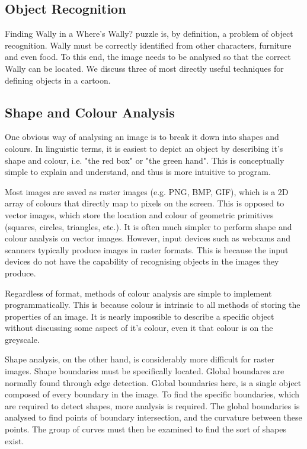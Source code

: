 \documentclass[../main.tex]{subfiles}
\begin{document}
  \subsection{Object Recognition}
    Finding Wally in a Where's Wally? puzzle is, by definition, a problem of object recognition.
    Wally must be correctly identified from other characters, furniture and even food.
    To this end, the image needs to be analysed so that the correct Wally can be located.
    We discuss three of most directly useful techniques for defining objects in a cartoon.
    \subsection{Shape and Colour Analysis}
      One obvious way of analysing an image is to break it down into shapes and colours.
      In linguistic terms, it is easiest to depict an object by describing it's shape and colour, i.e. "the red box" or "the green hand".
      This is conceptually simple to explain and understand, and thus is more intuitive to program.

      Most images are saved as raster images (e.g. PNG, BMP, GIF), which is a 2D array of colours that directly map to pixels on the screen.
      This is opposed to vector images, which store the location and colour of geometric primitives (squares, circles, triangles, etc.).
      It is often much simpler to perform shape and colour analysis on vector images.
      However, input devices such as webcams and scanners typically produce images in raster formats.
      This is because the input devices do not have the capability of recognising objects in the images they produce.

      Regardless of format, methods of colour analysis are simple to implement programmatically.
      This is because colour is intrinsic to all methods of storing the properties of an image.
      It is nearly impossible to describe a specific object without discussing some aspect of it's colour, even it that colour is on the greyscale.

      Shape analysis, on the other hand, is considerably more difficult for raster images.
      Shape boundaries must be specifically located.
      Global boundares are normally found through edge detection.
      Global boundaries here, is a single object composed of every boundary in the image.
      To find the specific boundaries, which are required to detect shapes, more analysis is required.
      The global boundaries is analysed to find points of boundary intersection, and the curvature between these points.
      The group of curves must then be examined to find the sort of shapes exist.
\end{document}
